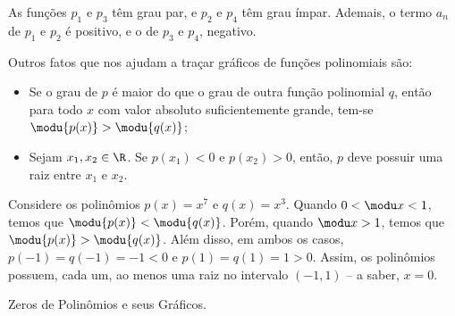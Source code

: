 \begin{solution}
  As funções $p_1$ e $p_3$ têm grau par, e $p_2$ e $p_4$ têm grau ímpar.
  Ademais, o termo $a_n$ de $p_1$ e $p_2$ é positivo, e o de $p_3$ e $p_4$, negativo.
\end{solution}


Outros fatos que nos ajudam a traçar gráficos de funções polinomiais são:
%
\begin{itemize}
\item Se o grau de $p$ é maior do que o grau de outra função polinomial $q$, 
então para todo $x$ com valor absoluto suficientemente grande, 
tem-se $\modu {p(x)} > \modu{q(x)}$;
\item Sejam $x_1, x_2 \in \R$. Se $p(x_1) < 0$ e $p(x_2)>0$,
então, $p$ deve possuir uma raiz entre $x_1$ e $x_2$.
\end{itemize}

\begin{example}
Considere os polinômios $p(x) = x^7 $ e $q(x)=x^3$. 
Quando $0< \modu x < 1$, temos que $\modu {p(x)} < \modu{q(x)}$. 
Porém, quando $ \modu x > 1$, temos que $\modu {p(x)} > \modu{q(x)}$. 
Além disso, em ambos os casos, $p(-1) = q(-1) = -1 <0$ e $p(1) = q(1) = 1 >0$.
Assim, os polinômios possuem, cada um, ao menos uma raiz no
intervalo $(-1, 1)$ -- a saber, $x=0$.
\end{example}

\begin{onlineact}
    {Zeros de Polinômios e seus Gráficos}.
\end{onlineact}
